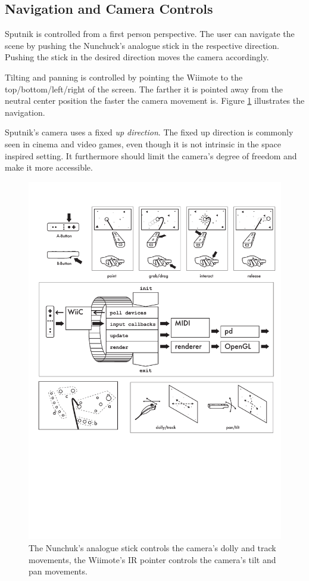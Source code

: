 \documentclass[10pt,a4paper]{scrartcl}
\begin{document}
\subsection{Navigation and Camera Controls}
\label{sec:navigation}
Sputnik is controlled from a first person perspective. The user can navigate the scene by pushing the Nunchuck's analogue stick in the respective direction. Pushing the stick in the desired direction moves the camera accordingly.

Tilting and panning is controlled by pointing the Wiimote to the top/bottom/left/right of the screen. The farther it is pointed away from the neutral center position the faster the camera movement is. Figure \ref{fig:sputnik-navigation} illustrates the navigation.

Sputnik's camera uses a fixed \emph{up direction}. The fixed up direction is commonly seen in cinema and video games, even though it is not intrinsic in the space inspired setting. It furthermore should limit the camera's degree of freedom and make it more accessible.

\begin{figure}[hbtp]
\begin{center}
\includegraphics[width=0.85\columnwidth]{img/navigation}
\caption{The Nunchuk's analogue stick controls the camera's dolly and track movements, the Wiimote's IR pointer controls the camera's tilt and pan movements.}
\label{fig:sputnik-navigation}
\end{center}
\end{figure}
\end{document}
